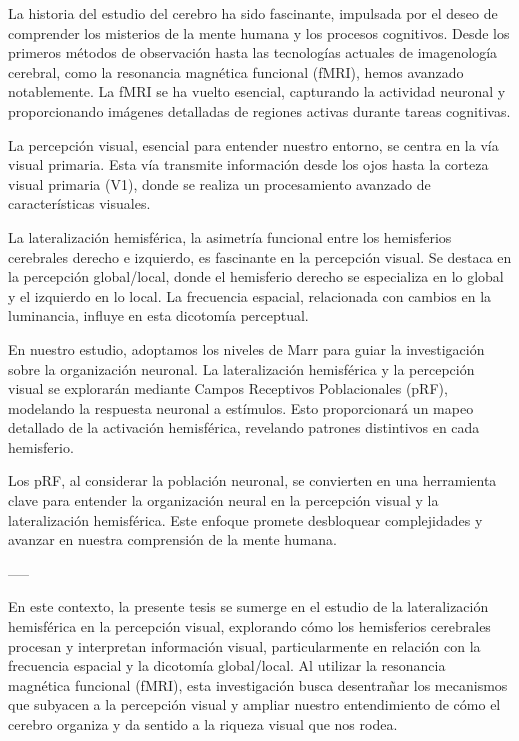 \documentclass{article}
\begin{document}
	La historia del estudio del cerebro ha sido fascinante, impulsada por el deseo de comprender los misterios de la mente humana y los procesos cognitivos. Desde los primeros métodos de observación hasta las tecnologías actuales de imagenología cerebral, como la resonancia magnética funcional (fMRI), hemos avanzado notablemente. La fMRI se ha vuelto esencial, capturando la actividad neuronal y proporcionando imágenes detalladas de regiones activas durante tareas cognitivas.
	
	La percepción visual, esencial para entender nuestro entorno, se centra en la vía visual primaria. Esta vía transmite información desde los ojos hasta la corteza visual primaria (V1), donde se realiza un procesamiento avanzado de características visuales.
	
	La lateralización hemisférica, la asimetría funcional entre los hemisferios cerebrales derecho e izquierdo, es fascinante en la percepción visual. Se destaca en la percepción global/local, donde el hemisferio derecho se especializa en lo global y el izquierdo en lo local. La frecuencia espacial, relacionada con cambios en la luminancia, influye en esta dicotomía perceptual.
	
	En nuestro estudio, adoptamos los niveles de Marr para guiar la investigación sobre la organización neuronal. La lateralización hemisférica y la percepción visual se explorarán mediante Campos Receptivos Poblacionales (pRF), modelando la respuesta neuronal a estímulos. Esto proporcionará un mapeo detallado de la activación hemisférica, revelando patrones distintivos en cada hemisferio.
	
	Los pRF, al considerar la población neuronal, se convierten en una herramienta clave para entender la organización neural en la percepción visual y la lateralización hemisférica. Este enfoque promete desbloquear complejidades y avanzar en nuestra comprensión de la mente humana.
	
	-----
	
	En este contexto, la presente tesis se sumerge en el estudio de la lateralización hemisférica en la percepción visual, explorando cómo los hemisferios cerebrales procesan y interpretan información visual, particularmente en relación con la frecuencia espacial y la dicotomía global/local. Al utilizar la resonancia magnética funcional (fMRI), esta investigación busca desentrañar los mecanismos que subyacen a la percepción visual y ampliar nuestro entendimiento de cómo el cerebro organiza y da sentido a la riqueza visual que nos rodea.
	
\end{document}
